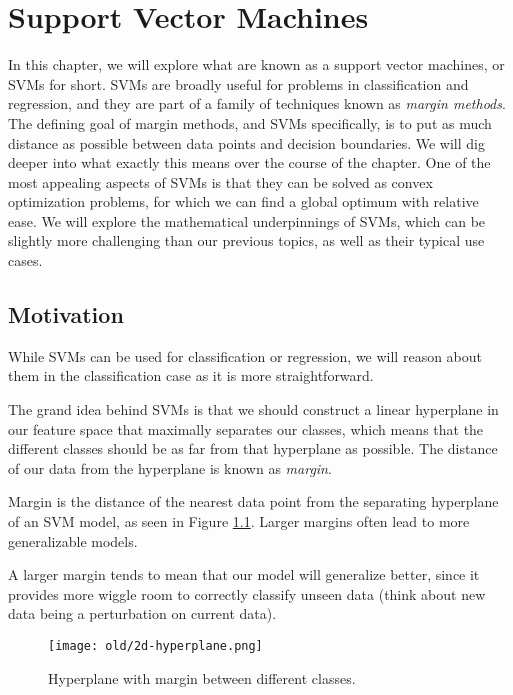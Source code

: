 \chapter{Support Vector Machines}
In this chapter, we will explore what are known as a support vector machines, or SVMs for short. SVMs are broadly useful for problems in classification and regression, and they are part of a family of techniques known as \textit{margin methods}. The defining goal of margin methods, and SVMs specifically, is to put as much distance as possible between data points and decision boundaries. We will dig deeper into what exactly this means over the course of the chapter. One of the most appealing aspects of SVMs is that they can be solved as convex optimization problems, for which we can find a global optimum with relative ease. We will explore the mathematical underpinnings of SVMs, which can be slightly more challenging than our previous topics, as well as their typical use cases.

\section{Motivation}
While SVMs can be used for classification or regression, we will reason about them in the classification case as it is more straightforward. 

The grand idea behind SVMs is that we should construct a linear hyperplane in our feature space that maximally separates our classes, which means that the different classes should be as far from that hyperplane as possible. The distance of our data from the hyperplane is known as \textit{margin}.

\begin{definition}[margin]
  Margin is the distance of the nearest data point from the separating hyperplane of an SVM model, as seen in Figure \ref{fig:2d-hyperplane}. Larger margins often lead to more generalizable models.
\end{definition}

A larger margin tends to mean that our model will generalize better, since it provides more wiggle room to correctly classify unseen data (think about new data being a perturbation on current data).

\begin{figure}
    \centering
    \texttt{[image: old/2d-hyperplane.png]}
    \caption{Hyperplane with margin between different classes.}
    \label{fig:2d-hyperplane}
\end{figure}

